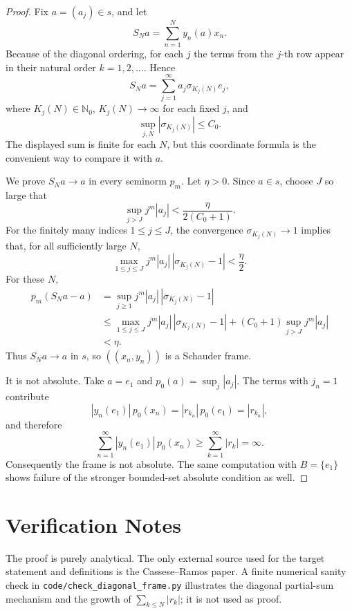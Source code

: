 \documentclass[11pt]{article}
\newcommand{\N}{\mathbb N}
\begin{document}
\begin{proof}
Fix \(a=(a_j)\in s\), and let
\[
        S_N a=\sum_{n=1}^N y_n(a)x_n.
\]
Because of the diagonal ordering, for each \(j\) the terms from the \(j\)-th row appear in their natural order \(k=1,2,\ldots\). Hence
\[
        S_Na=\sum_{j=1}^{\infty} a_j \sigma_{K_j(N)} e_j,
\]
where \(K_j(N)\in\N_0\), \(K_j(N)\to\infty\) for each fixed \(j\), and
\[
        \sup_{j,N} |\sigma_{K_j(N)}|\le C_0.
\]
The displayed sum is finite for each \(N\), but this coordinate formula is the convenient way to compare it with \(a\).

We prove \(S_Na\to a\) in every seminorm \(p_m\). Let \(\eta>0\). Since \(a\in s\), choose \(J\) so large that
\[
        \sup_{j>J} j^m |a_j| < \frac{\eta}{2(C_0+1)}.
\]
For the finitely many indices \(1\le j\le J\), the convergence
\(\sigma_{K_j(N)}\to 1\) implies that, for all sufficiently large \(N\),
\[
        \max_{1\le j\le J} j^m |a_j|\,|\sigma_{K_j(N)}-1|<\frac{\eta}{2}.
\]
For these \(N\),
\[
\begin{aligned}
        p_m(S_Na-a)
        &=\sup_{j\ge 1} j^m |a_j|\,|\sigma_{K_j(N)}-1|\\
        &\le \max_{1\le j\le J} j^m |a_j|\,|\sigma_{K_j(N)}-1|
          +(C_0+1)\sup_{j>J} j^m |a_j|\\
        &<\eta.
\end{aligned}
\]
Thus \(S_Na\to a\) in \(s\), so \(((x_n,y_n))\) is a Schauder frame.

It is not absolute. Take \(a=e_1\) and \(p_0(a)=\sup_j |a_j|\). The terms with \(j_n=1\) contribute
\[
        |y_n(e_1)|\,p_0(x_n)=|r_{k_n}|\,p_0(e_1)=|r_{k_n}|,
\]
and therefore
\[
        \sum_{n=1}^{\infty} |y_n(e_1)|\,p_0(x_n)
        \ge \sum_{k=1}^{\infty} |r_k|
        =\infty.
\]
Consequently the frame is not absolute. The same computation with \(B=\{e_1\}\) shows failure of the stronger bounded-set absolute condition as well.
\end{proof}

\section*{Verification Notes}

The proof is purely analytical. The only external source used for the target statement and definitions is the Cassese--Ramos paper. A finite numerical sanity check in \texttt{code/check\_diagonal\_frame.py} illustrates the diagonal partial-sum mechanism and the growth of \(\sum_{k\le N}|r_k|\); it is not used as proof.
\end{document}
